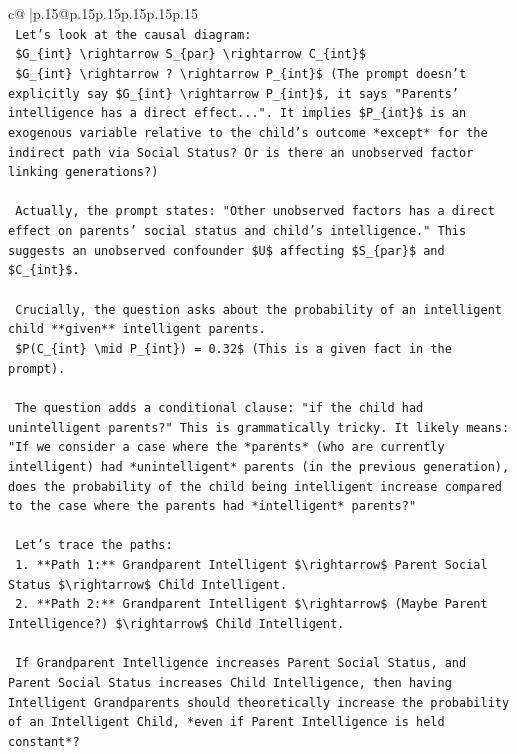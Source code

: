 \documentclass{article}
\begin{document}
{\begin{supertabular}{c@{$\;$}|p{.15\linewidth}@{}p{.15\linewidth}p{.15\linewidth}p{.15\linewidth}p{.15\linewidth}p{.15\linewidth}}
{{{\\ 
\texttt{    Let's look at the causal diagram:} \\
\texttt{    \$G\_\{int\} \textbackslash{}rightarrow S\_\{par\} \textbackslash{}rightarrow C\_\{int\}\$} \\
\texttt{    \$G\_\{int\} \textbackslash{}rightarrow ? \textbackslash{}rightarrow P\_\{int\}\$ (The prompt doesn't explicitly say \$G\_\{int\} \textbackslash{}rightarrow P\_\{int\}\$, it says "Parents' intelligence has a direct effect...". It implies \$P\_\{int\}\$ is an exogenous variable relative to the child's outcome *except* for the indirect path via Social Status? Or is there an unobserved factor linking generations?)} \\
\\ 
\texttt{    Actually, the prompt states: "Other unobserved factors has a direct effect on parents' social status and child's intelligence." This suggests an unobserved confounder \$U\$ affecting \$S\_\{par\}\$ and \$C\_\{int\}\$.} \\
\\ 
\texttt{    Crucially, the question asks about the probability of an intelligent child **given** intelligent parents.} \\
\texttt{    \$P(C\_\{int\} \textbackslash{}mid P\_\{int\}) = 0.32\$ (This is a given fact in the prompt).} \\
\\ 
\texttt{    The question adds a conditional clause: "if the child had unintelligent parents?" This is grammatically tricky. It likely means: "If we consider a case where the *parents* (who are currently intelligent) had *unintelligent* parents (in the previous generation), does the probability of the child being intelligent increase compared to the case where the parents had *intelligent* parents?"} \\
\\ 
\texttt{    Let's trace the paths:} \\
\texttt{    1.  **Path 1:** Grandparent Intelligent \$\textbackslash{}rightarrow\$ Parent Social Status \$\textbackslash{}rightarrow\$ Child Intelligent.} \\
\texttt{    2.  **Path 2:** Grandparent Intelligent \$\textbackslash{}rightarrow\$ (Maybe Parent Intelligence?) \$\textbackslash{}rightarrow\$ Child Intelligent.} \\
\\ 
\texttt{    If Grandparent Intelligence increases Parent Social Status, and Parent Social Status increases Child Intelligence, then having Intelligent Grandparents should theoretically increase the probability of an Intelligent Child, *even if Parent Intelligence is held constant*?} \\
}}}
\end{supertabular}}
\end{document}
